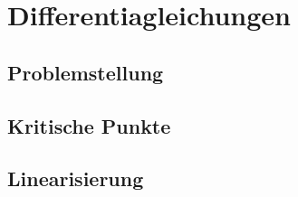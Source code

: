 %
%
%
\chapter{Differentiagleichungen}

\section{Problemstellung}

\section{Kritische Punkte}

\section{Linearisierung}

